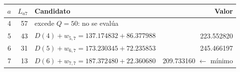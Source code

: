 \begin{tabular}{rrlr}\toprule
$a$ & $L_{a7}$ & Candidato & Valor\\\midrule
4 & 57 & \multicolumn{2}{l}{excede $Q=50$: no se evalúa}\\
5 & 43 & $D(4)+w_{5,7}=137.174832+86.377988$ & 223.552820\\
6 & 31 & $D(5)+w_{6,7}=173.230345+72.235853$ & 245.466197\\
7 & 13 & $D(6)+w_{7,7}=187.372480+22.360680$ & 209.733160 $\leftarrow$ mínimo\\
\bottomrule\end{tabular}
